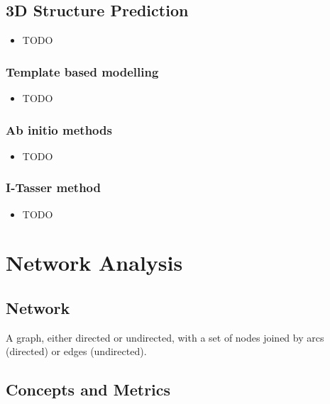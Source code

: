 \documentclass[a4paper]{article}
\begin{document}
\subsection{3D Structure Prediction}

\begin{itemize}
  \item
    TODO
\end{itemize}

\subsubsection{Template based modelling}

\begin{itemize}
  \item
    TODO
\end{itemize}

\subsubsection{Ab initio methods}

\begin{itemize}
  \item
    TODO
\end{itemize}

\subsubsection{I-Tasser method}

\begin{itemize}
  \item
    TODO
\end{itemize}

\section{Network Analysis}

\subsection{Network}

A graph, either directed or undirected, with a set of nodes joined by arcs
(directed) or edges (undirected).

\subsection{Concepts and Metrics}
\end{document}
